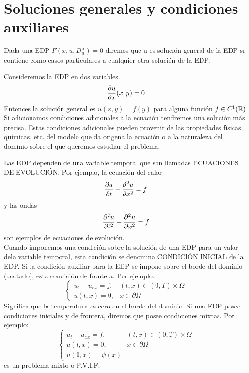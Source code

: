 \section{Soluciones generales y condiciones auxiliares}
Dada una EDP $F(x,u,D^{\alpha}_u)=0$ diremos que u es solución general de la EDP si contiene como casos particulares a cualquier otra solución de la EDP.
\begin{Ejm}
    Consideremos la EDP en dos variables.
    $$\frac{\partial u}{\partial x}(x,y)=0$$
    Entonces la solución general es $u(x,y)=f(y)$ para alguna función $f\in C^1({\mathbb{R}})$\\
    Si adicionamos condiciones adicionales a la ecuación tendremos una solución más precisa. Estas condiciones adicionales pueden provenir de las propiedades físicas, químicas, etc. del modelo que da origena la ecuación o a la naturaleza del dominio sobre el que queremos estudiar el problema.
\end{Ejm}
Las EDP dependen de una variable temporal que son llamadas ECUACIONES DE EVOLUCIÓN. Por ejemplo, la ecuación del calor  $$\frac{\partial u}{\partial t}-\frac{\partial^2u}{\partial x^2}=f$$ y las ondas $$\frac{\partial^2u}{\partial t^2}-\frac{\partial^2u}{\partial x^2}=f$$ son ejemplos de ecuaciones de evolución.\\Cuando imponemos una condición sobre la solución de una EDP para un valor dela variable temporal, esta condición se denomina CONDICIÓN INICIAL de la EDP.
Si la condición auxiliar para la EDP se impone sobre el borde del dominio (acotado), esta condición de frontera. Por ejemplo:
$$
\begin{cases}
    u_t-u_{xx}=f,
    & \mbox{$(t,x)\in (0,T)\times\Omega$}\\
    u(t,x)=0, & \mbox{$x\in\partial\Omega$}
\end{cases}
$$
Significa que la temperatura es cero en el borde del dominio. Si una EDP posee condiciones iniciales y de frontera, diremos que posee condiciones mixtas. Por ejemplo:$$
\begin{cases}
    u_t-u_{xx}=f,
    & \mbox{$(t,x)\in (0,T)\times\Omega$}\\
    u(t,x)=0, & \mbox{$x\in\partial\Omega$}\\
    u(0,x)=\psi(x)
\end{cases}
$$
es un problema mixto o P.V.I.F.